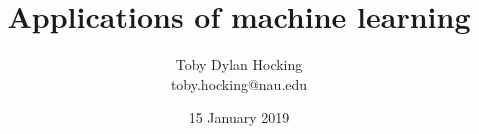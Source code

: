 \documentclass{beamer}
\begin{document}
\title{Applications of machine learning}
  \date{15 January 2019}
\author{
  Toby Dylan Hocking\\
  toby.hocking@nau.edu
}

\maketitle


\end{document}

